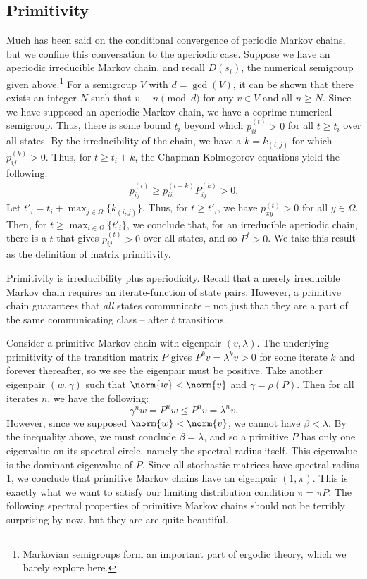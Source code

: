 \documentclass[12pt]{article}
\newcommand{\iterate}[2]{#1^{(#2)}}
\begin{document}
\subsection{Primitivity}
Much has been said on the conditional convergence of periodic Markov chains, but
we confine this conversation to the aperiodic case. Suppose we have an aperiodic
irreducible Markov chain, and recall $D(s_i)$, the numerical semigroup given
above.\footnote{Markovian semigroups form an important part of ergodic theory,
  which we barely explore here.} For a semigroup $V$ with $d=\gcd(V)$, it can be
shown that there exists an integer $N$ such that $v\equiv n \pmod{d}$ for any
$v\in V$ and all $n \geq N$. Since we have supposed an aperiodic Markov chain,
we have a coprime numerical semigroup. Thus, there is some bound $t_i$ beyond
which $\iterate{p}{t}_{ii} > 0$ for all $t \geq t_i$ over all states. By the
irreducibility of the chain, we have a $k = k_{(i,j)}$ for which
$\iterate{p}{k}_{ij} > 0$. Thus, for $t \geq t_i + k$, the Chapman-Kolmogorov
equations yield the following:
\begin{align*}
  \iterate{p}{t}_{ij} \geq \iterate{p}{t-k}_{ii} \iterate{P}{k}_{ij} > 0.
\end{align*}
Let $t'_i = t_i + \max_{j\in\Omega}\{ k_{(i,j)} \}$. Thus, for $t \geq t'_i$, we
have $\iterate{p}{t}_{xy} > 0$ for all $y\in\Omega$. Then, for
$t \geq \max_{i\in\Omega}\{ t'_i \}$, we conclude that, for an irreducible
aperiodic chain, there is a $t$ that gives $\iterate{p}{t}_{ij} > 0$ over all
states, and so $P^t > 0$. We take this result as the definition of matrix
primitivity.

Primitivity is irreducibility plus aperiodicity. Recall that a merely
irreducible Markov chain requires an iterate-function of state pairs. However, a
primitive chain guarantees that \textit{all} states communicate -- not just that
they are a part of the same communicating class -- after $t$ transitions.

Consider a primitive Markov chain with eigenpair $(v, \lambda)$. The underlying
primitivity of the transition matrix $P$ gives $P^k v = \lambda^k v > 0$ for
some iterate $k$ and forever thereafter, so we see the eigenpair must be
positive. Take another eigenpair $(w, \gamma)$ such that $\norm{w} < \norm{v}$
and $\gamma = \rho(P)$. Then for all iterates $n$, we have the following:
\begin{equation*}
  \gamma^n w = P^n w \leq P^n v = \lambda^n v.
\end{equation*}
However, since we supposed $\norm{w} < \norm{v}$, we cannot have
$\beta < \lambda$. By the inequality above, we must conclude $\beta = \lambda$,
and so a primitive $P$ has only one eigenvalue on its spectral circle, namely
the spectral radius itself. This eigenvalue is the dominant eigenvalue of $P$.
Since all stochastic matrices have spectral radius 1, we conclude that primitive
Markov chains have an eigenpair $(1, \pi)$. This is exactly what we want to
satisfy our limiting distribution condition $\pi = \pi P$. The following
spectral properties of primitive Markov chains should not be terribly surprising
by now, but they are are quite beautiful.
\end{document}
